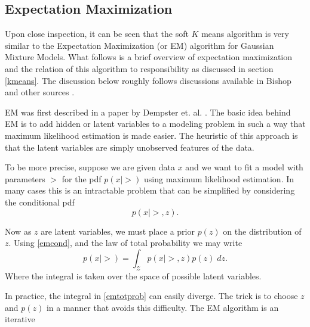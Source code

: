 
\subsection{Expectation Maximization} \label{emAlg}
Upon close inspection, it can be seen that the soft \(K\) means algorithm is 
very similar to the Expectation Maximization (or EM) algorithm for Gaussian 
Mixture Models.  What follows is a brief overview of expectation maximization
and the relation of this algorithm to responsibility as discussed in section 
\ref{kmeans}. The discussion below roughly follows discussions available in 
Bishop and other sources \cite{MML_2019, BishopBook, hastie09esl}.

EM was first described in a paper by Dempster et. al. \cite{Dempster77EM}.
The basic idea behind EM is to add hidden or latent variables to a modeling
problem in such a way that maximum likelihood estimation is made easier.  The 
heuristic of this approach is that the latent variables are simply unobserved 
features of the data.  

To be more precise, suppose we are given data $ x $ and we want to fit a model 
with parameters $ \gt $ for the pdf \( p(x|\gt) \) using maximum likelihood 
estimation. In many cases this is an intractable problem that can be simplified
by considering the conditional pdf
\begin{equation}\label{emcond}	
p(x|\gt,z).
\end{equation}

Now as \( z \) are latent variables, we must place a prior \( p(z) \) on the 
distribution of \( z. \) Using \ref{emcond}, and the law of total probability 
we may write
\begin{equation}\label{emtotprob}
p(x|\gt)=\int_{\mathcal{Z}} p(x|\gt,z)p(z)\;dz.
\end{equation}
Where the integral is taken over the space of possible latent variables.

In practice, the integral in \ref{emtotprob} can easily diverge.  The trick is
to choose \( z \) and \( p(z) \) in a manner that avoids this difficulty. 
The EM algorithm is an iterative


